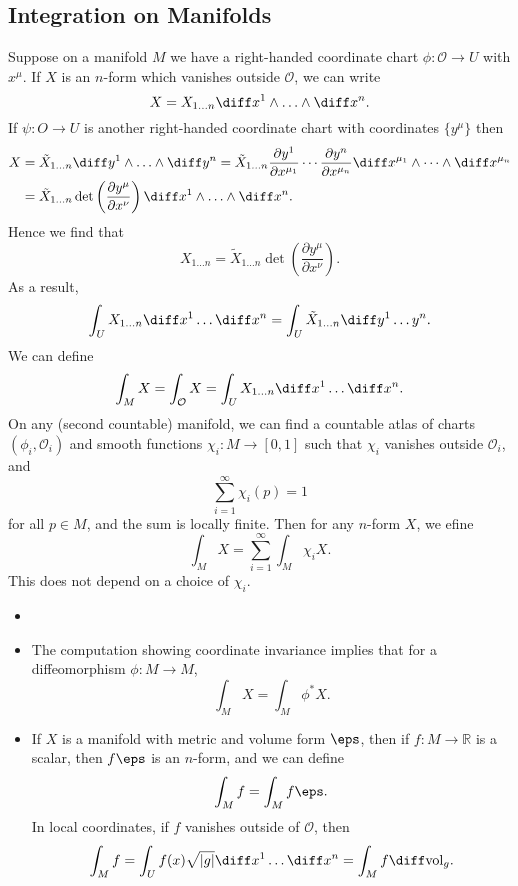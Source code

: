 \documentclass[12pt]{article}
\begin{document}
\subsection{Integration on Manifolds}%
\label{sub:int}

Suppose on a manifold $M$ we have a right-handed coordinate chart $\phi : \mathcal{O} \to U$ with $x^\mu$. If $X$ is an $n$-form which vanishes outside $\mathcal{O}$, we can write
\[
X = X_{1 \ldots n} \diff x^1 \wedge \ldots \wedge \diff x^n.
\]
If $\psi : O \to U$ is another right-handed coordinate chart with coordinates $\{y^\mu\}$ then
\begin{align*}
	X &= \tilde X_{1 \ldots n} \diff y^1 \wedge \ldots \wedge \diff y^n = \tilde X_{1 \ldots n} \frac{\partial y^1}{\partial x^{\mu_1}} \cdots \frac{\partial y^n}{\partial x^{\mu_n}} \diff x^{\mu_1} \wedge \cdots \wedge \diff x^{\mu_n} \\
	  &= \tilde X_{1 \ldots n} \det \left( \frac{\partial y^\mu}{\partial x^\nu} \right) \diff x^1 \wedge \ldots \wedge \diff x^n.
\end{align*}
Hence we find that
\[
X_{1 \ldots n} = \tilde X_{1 \ldots n} \det \left( \frac{\partial y^\mu}{\partial x^\nu} \right).
\]
As a result,
\[
\int_{U} X_{1 \ldots n} \diff x^1 \ldots \diff x^n = \int_U \tilde X_{1\ldots n} \diff y^1 \ldots y^n.
\]
We can define
\[
\int_M X = \int_\mathcal{O} X = \int_U X_{1 \ldots n} \diff x^1 \ldots \diff x^n. 
\]
On any (second countable) manifold, we can find a countable atlas of charts $(\phi_i, \mathcal{O}_i)$ and smooth functions $\chi_i : M \to [0, 1]$ such that $\chi_i$ vanishes outside $\mathcal{O}_i$, and
\[
\sum_{i = 1}^\infty \chi_i(p) = 1
\]
for all $p \in M$, and the sum is locally finite. Then for any $n$-form $X$, we efine
\[
\int_M X = \sum_{i = 1}^\infty \int_M \chi_i X.
\]
This does not depend on a choice of $\chi_i$.

\begin{remark}
	\begin{itemize}
		\item[]
		\item The computation showing coordinate invariance implies that for a diffeomorphism $\phi : M \to M$,
			\[
			\int_M X = \int_M \phi^{\ast} X.
			\]
		\item If $X$ is a manifold with metric and volume form $\eps$, then if $f : M \to \mathbb{R}$ is a scalar, then $f \eps$ is an $n$-form, and we can define
			\[
			\int_M f = \int_M f\eps.
			\]
			In local coordinates, if $f$ vanishes outside of $\mathcal{O}$, then
			\[
				\int_M f = \int_U f(x) \sqrt{|g|} \diff x^1 \ldots \diff x^n = \int_M f \diff \mathrm{vol}_g.
			\]
	\end{itemize}
\end{remark}
\end{document}
